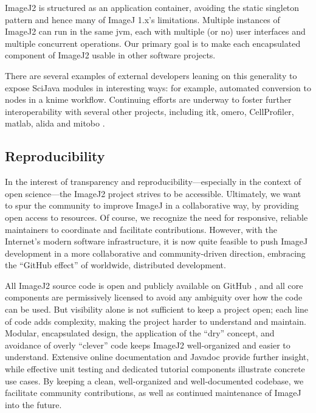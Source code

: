 \documentclass{bmcart}
\begin{document}
ImageJ2 is structured as an application container, avoiding the static
singleton pattern and hence many of ImageJ 1.x's limitations. Multiple
instances of ImageJ2 can run in the same \acrshort{jvm}, each with multiple (or
no) user interfaces and multiple concurrent operations. Our primary goal is to
make each encapsulated component of ImageJ2 usable in other software projects.

There are several examples of external developers leaning on this generality to
expose SciJava modules in interesting ways: for example, automated conversion
to nodes in a \acrshort{knime} workflow. Continuing efforts are underway to
foster further interoperability with several other projects, including
\acrshort{itk}, \acrshort{omero}, CellProfiler, \acrshort{matlab},
\acrshort{alida} and \acrshort{mitobo} \cite{mitobo}.

\subsection*{Reproducibility}

In the interest of transparency and reproducibility---especially in the context
of open science---the ImageJ2 project strives to be accessible. Ultimately, we
want to spur the community to improve ImageJ in a collaborative way, by
providing open access to resources. Of course, we recognize the need for
responsive, reliable maintainers to coordinate and facilitate contributions.
However, with the Internet's modern software infrastructure, it is now quite
feasible to push ImageJ development in a more collaborative and
community-driven direction, embracing the ``GitHub effect''
\cite{github_effect} of worldwide, distributed development.

All ImageJ2 source code is open and publicly available on GitHub
\cite{imagej_source_code}, and all core components are permissively licensed
\cite{imagej_licensing} to avoid any ambiguity over how the code can be used.
But visibility alone is not sufficient to keep a project open; each line of
code adds complexity, making the project harder to understand and maintain.
Modular, encapsulated design, the application of the ``\acrfull{dry}'' concept,
and avoidance of overly ``clever'' code keeps ImageJ2 well-organized and easier
to understand. Extensive online documentation \cite{imagej_web_site} and
Javadoc \cite{imagej_javadoc} provide further insight, while effective unit
testing and dedicated tutorial components illustrate concrete use cases. By
keeping a clean, well-organized and well-documented codebase, we facilitate
community contributions, as well as continued maintenance of ImageJ into the
future.
\end{document}
